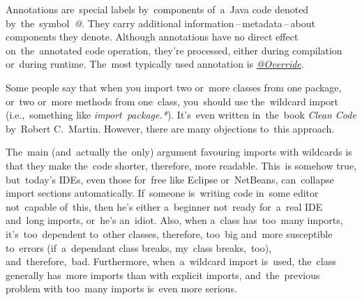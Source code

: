 
\label{javaabstractclasses}

\label{javainterfaces}

\label{javaannotation}
Annotations are~special labels by~components of~a~Java code denoted by~the~symbol~\textquotesingle\textit{@}\textquotesingle. They carry additional information\,--\,metadata\,--\,about components they denote. Although annotations have no direct effect on~the~annotated code operation, they're processed, either during compilation or~during runtime. The~most typically used annotation is \hyperref[javaoverride]{\textit{@Override}}.

\label{annotationsrepeatable}

\label{javagenerics}

\label{javathread}

\label{javathreadsafety}


\label{reflection}

\label{accessmodifiers}

Some people say that when you import two or~more classes from one package, or~two or~more methods from one~class, you~should use the~wildcard import (i.e.,~something like \textit{import~package.*}). It's~even written in~the~book \textit{Clean Code} by~Robert C.~Martin. However, there are many objections to~this approach.

The~main (and~actually the~only) argument favouring imports with wildcards is that they make the~code shorter, therefore, more readable. This~is somehow true, but~today's IDEs, even those for~free like Eclipse or~NetBeans, can~collapse import sections automatically. If~someone is~writing code in~some editor not~capable of~this, then he's either a~beginner not~ready for~a~real IDE and~long imports, or~he's an~idiot. Also, when a~class has~too~many imports, it's~too~dependent to~other classes, therefore, too~big and~more susceptible to~errors (if~a~dependant class breaks, my~class breaks,~too), and~therefore,~bad. Furthermore, when~a~wildcard import is~used, the~class generally has~more imports than with explicit imports, and~the~previous problem with too~many imports is~even more serious.

